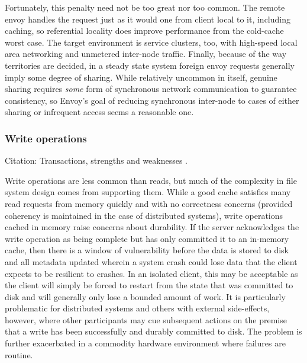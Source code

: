Fortunately, this penalty need not be too great nor too common. The remote envoy handles the request just as it would one from client local to it, including caching, so referential locality does improve performance from the cold-cache worst case. The target environment is service clusters, too, with high-speed local area networking and unmetered inter-node traffic. Finally, because of the way territories are decided, in a steady state system foreign envoy requests generally imply some degree of sharing. While relatively uncommon in itself, genuine sharing requires \emph{some} form of synchronous network communication to guarantee consistency, so Envoy's goal of reducing synchronous inter-node to cases of either sharing or infrequent access seems a reasonable one.

\subsubsection{Write operations}\label{sec:data-paths-write}

Citation: Transactions, strengths and weaknesses \cite{gray81}.

Write operations are less common than reads, but much of the complexity in file system design comes from supporting them. While a good cache satisfies many read requests from memory quickly and with no correctness concerns (provided coherency is maintained in the case of distributed systems), write operations cached in memory raise concerns about durability. If the server acknowledges the write operation as being complete but has only committed it to an in-memory cache, then there is a window of vulnerability before the data is stored to disk and all metadata updated wherein a system crash could lose data that the client expects to be resilient to crashes. In an isolated client, this may be acceptable as the client will simply be forced to restart from the state that was committed to disk and will generally only lose a bounded amount of work. It is particularly problematic for distributed systems and others with external side-effects, however, where other participants may cue subsequent actions on the premise that a write has been successfully and durably committed to disk. The problem is further exacerbated in a commodity hardware environment where failures are routine.

